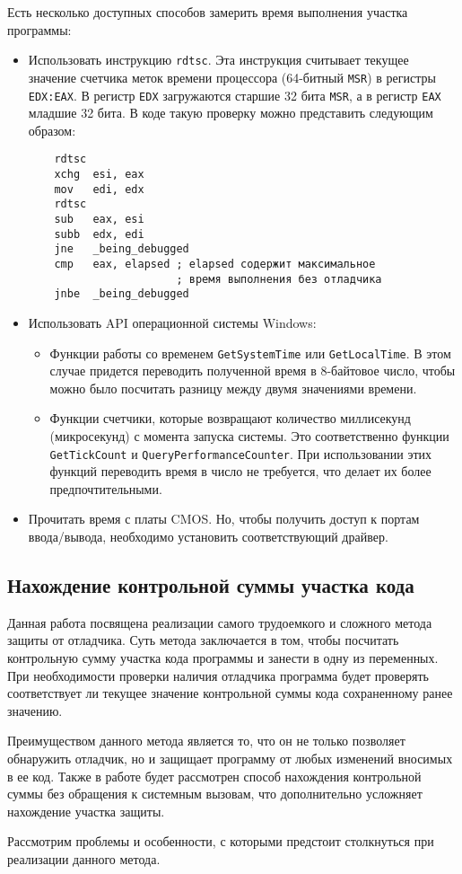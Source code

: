 Есть несколько доступных способов замерить время выполнения участка программы:
\begin{itemize}
  \item Использовать инструкцию \verb!rdtsc!. Эта инструкция считывает текущее
    значение счетчика меток времени процессора (64-битный \verb!MSR!) в регистры
    \verb!EDX:EAX!. В регистр \verb!EDX! загружаются старшие 32 бита \verb!MSR!,
    а в регистр \verb!EAX! младшие 32 бита. В коде такую проверку можно
    представить следующим образом:
    \begin{verbatim}
    rdtsc
    xchg  esi, eax
    mov   edi, edx
    rdtsc
    sub   eax, esi
    subb  edx, edi
    jne   _being_debugged
    cmp   eax, elapsed ; elapsed содержит максимальное
                       ; время выполнения без отладчика
    jnbe  _being_debugged
    \end{verbatim}

  \item Использовать API операционной системы Windows:
    \begin{itemize}
      \item Функции работы со временем \verb!GetSystemTime! или
        \verb!GetLocalTime!. В этом случае придется переводить полученной время
        в 8-байтовое число, чтобы можно было посчитать разницу между двумя
        значениями времени.
      \item Функции счетчики, которые возвращают количество миллисекунд
        (микросекунд) с момента запуска системы. Это соответственно функции
        \verb!GetTickCount! и \verb!QueryPerformanceCounter!. При использовании
        этих функций переводить время в число не требуется, что делает их более
        предпочтительными.
    \end{itemize}

  \item Прочитать время с платы CMOS. Но, чтобы получить доступ к портам
    ввода/вывода, необходимо установить соответствующий драйвер.
\end{itemize}

\subsection{Нахождение контрольной суммы участка кода}
Данная работа посвящена реализации самого трудоемкого и сложного метода защиты
от отладчика. Суть метода заключается в том, чтобы посчитать контрольную сумму
участка кода программы и занести в одну из переменных. При необходимости
проверки наличия отладчика программа будет проверять соответствует ли текущее
значение контрольной суммы кода сохраненному ранее значению. 

Преимуществом данного метода является то, что он не только позволяет обнаружить
отладчик, но и защищает программу от любых изменений вносимых в ее код. Также
в работе будет рассмотрен способ нахождения контрольной суммы без обращения к
системным вызовам, что дополнительно усложняет нахождение участка защиты.

Рассмотрим проблемы и особенности, с которыми предстоит столкнуться при
реализации данного метода.
